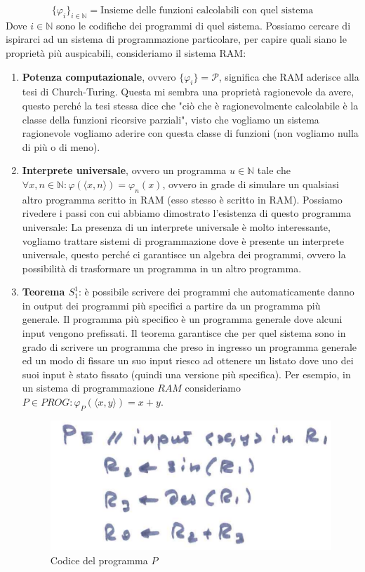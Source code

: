 \documentclass{article}
\begin{document}
$$\{\varphi_i\}_{i\in\mathbb{N}}=\text{Insieme delle funzioni calcolabili con quel sistema}$$
Dove $i\in\mathbb{N}$ sono le codifiche dei programmi di quel sistema.
Possiamo cercare di ispirarci ad un sistema di programmazione particolare, per capire
quali siano le proprietà più auspicabili, consideriamo il sistema RAM:
\begin{enumerate}
    \item \textbf{Potenza computazionale}, ovvero $\{\varphi_i\}=\mathcal{P}$, significa che RAM
          aderisce alla tesi di Church-Turing. Questa mi sembra una proprietà ragionevole da avere,
          questo perché la tesi stessa dice che "ciò che è ragionevolmente calcolabile è la classe della
          funzioni ricorsive parziali", visto che vogliamo un sistema ragionevole vogliamo aderire con
          questa classe di funzioni (non vogliamo nulla di più o di meno).
    \item \textbf{Interprete universale}, ovvero un programma $u\in\mathbb{N}$ tale che
          $\forall x,n\in\mathbb{N}:\varphi(\langle x,n\rangle)=\varphi_n(x)$, ovvero in grade di
          simulare un qualsiasi altro programma scritto in RAM (esso stesso è scritto in RAM). Possiamo
          rivedere i passi con cui abbiamo dimostrato l'esistenza di questo programma universale:
          La presenza di un interprete universale è molto interessante, vogliamo trattare sistemi di programmazione
          dove è presente un interprete universale, questo perché ci garantisce un algebra dei programmi, ovvero
          la possibilità di trasformare un programma in un altro programma.
    \item \textbf{Teorema $S_1^1$}: è possibile scrivere dei programmi che automaticamente danno in output dei programmi
          più specifici a partire da un programma più generale. Il programma più specifico è un programma generale dove
          alcuni input vengono prefissati. Il teorema garantisce che per quel sistema sono in grado di scrivere un programma
          che preso in ingresso un programma generale ed un modo di fissare un suo input riesco ad ottenere un listato dove uno dei
          suoi input è stato fissato (quindi una versione più specifica).
          Per esempio, in un sistema di programmazione $RAM$ consideriamo $P\in PROG:\varphi_P(\langle x,y\rangle)=x+y$.
          \begin{figure}[H]
              \centering
              \includegraphics[scale=0.5]{images/programma_p.png}
              \caption{Codice del programma $P$}
          \end{figure}


\end{enumerate}
\end{document}

